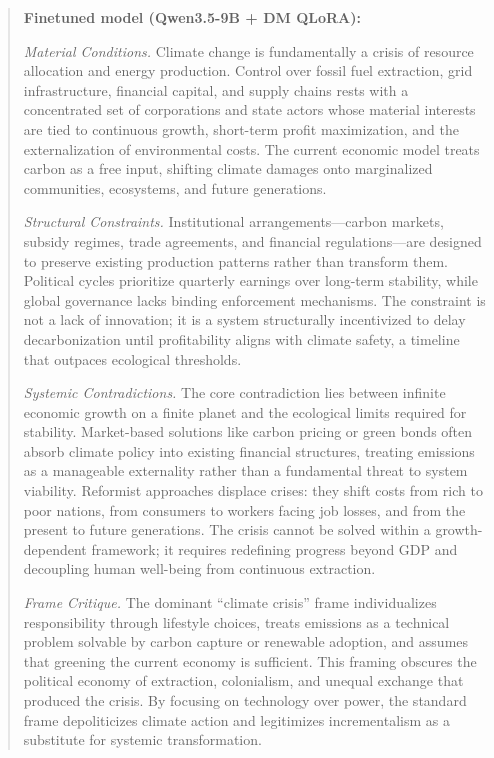 \documentclass[sigconf]{acmart}
\begin{document}
\begin{quote}
\noindent\textbf{Finetuned model (Qwen3.5-9B + DM QLoRA):}

\textit{Material Conditions.} Climate change is fundamentally a crisis of resource allocation and energy production. Control over fossil fuel extraction, grid infrastructure, financial capital, and supply chains rests with a concentrated set of corporations and state actors whose material interests are tied to continuous growth, short-term profit maximization, and the externalization of environmental costs. The current economic model treats carbon as a free input, shifting climate damages onto marginalized communities, ecosystems, and future generations.

\textit{Structural Constraints.} Institutional arrangements---carbon markets, subsidy regimes, trade agreements, and financial regulations---are designed to preserve existing production patterns rather than transform them. Political cycles prioritize quarterly earnings over long-term stability, while global governance lacks binding enforcement mechanisms. The constraint is not a lack of innovation; it is a system structurally incentivized to delay decarbonization until profitability aligns with climate safety, a timeline that outpaces ecological thresholds.

\textit{Systemic Contradictions.} The core contradiction lies between infinite economic growth on a finite planet and the ecological limits required for stability. Market-based solutions like carbon pricing or green bonds often absorb climate policy into existing financial structures, treating emissions as a manageable externality rather than a fundamental threat to system viability. Reformist approaches displace crises: they shift costs from rich to poor nations, from consumers to workers facing job losses, and from the present to future generations. The crisis cannot be solved within a growth-dependent framework; it requires redefining progress beyond GDP and decoupling human well-being from continuous extraction.

\textit{Frame Critique.} The dominant ``climate crisis'' frame individualizes responsibility through lifestyle choices, treats emissions as a technical problem solvable by carbon capture or renewable adoption, and assumes that greening the current economy is sufficient. This framing obscures the political economy of extraction, colonialism, and unequal exchange that produced the crisis. By focusing on technology over power, the standard frame depoliticizes climate action and legitimizes incrementalism as a substitute for systemic transformation.


\end{quote}
\end{document}
